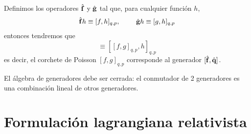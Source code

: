 \documentclass[]{article}
\numberwithin{equation}{section}
\begin{document}
Definimos los operadores \(\hat{\mathbf{f}}\) y \(\hat{\mathbf{g}}\) tal que, para cualquier función \(h\),
\begin{equation}
	\hat{\mathbf{f}} h \equiv [f,h]_{q,p}, ~~~~~~~ \hat{\mathbf{g}} h \equiv [g,h]_{q,p}
\end{equation}
entonces tendremos que
\begin{equation}
	[\hat{\n{f}}, \hat{\n{g}}] \equiv [[f,g]_{q,p}, h]_{q,p}
\end{equation}
es decir, el corchete de Poisson \([f,g]_{q,p}\) corresponde al generador \([\hat{\mathbf{f}}, \hat{\mathbf{q}}]\).

El álgebra de generadores debe ser cerrada: el conmutador de 2 generadores es una combinación lineal de otros generadores.


\section{Formulación lagrangiana relativista}
\end{document}
